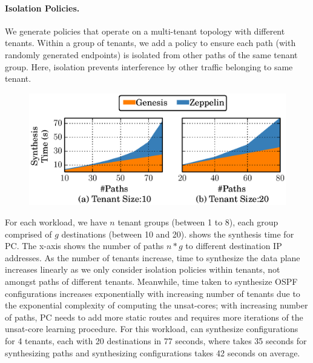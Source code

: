
\paragraph{Isolation Policies.}
We generate policies that operate 
on a multi-tenant topology with 
 different tenants.
Within a  group of tenants, we add a policy to ensure
each path  (with randomly generated endpoints)
is isolated from other paths of the same tenant group.
Here, isolation  prevents interference by other traffic belonging to
same tenant.  
 
 \begin{figure}
 	\includegraphics[width=0.5\columnwidth]{figures/ospfisolation.eps}
 	\vspace{-8pt}
 \end{figure}
 
For each 
workload, we have $n$ tenant groups (between 1 to 8), 
each group comprised of $g$ destinations (between 10 and 20). 
shows the synthesis time 
for PC.
The x-axis shows the number of paths $n * g$ 
to different destination IP addresses. 
 As the number of tenants increase, time to 
synthesize the data plane increases linearly as we only 
consider isolation policies within tenants, not amongst paths 
of different tenants. Meanwhile, time taken to synthesize 
OSPF configurations increases exponentially with increasing 
number of tenants due to the exponential complexity of computing 
the unsat-cores; with increasing number of 
paths, PC needs to add more static routes 
and requires more iterations of the unsat-core learning
procedure. 
For this workload, \name can
synthesize configurations for 4 tenants, each with
20 destinations in 77 seconds, where \genesis takes 35 seconds
for synthesizing paths and synthesizing configurations
takes 42 seconds on average. 



